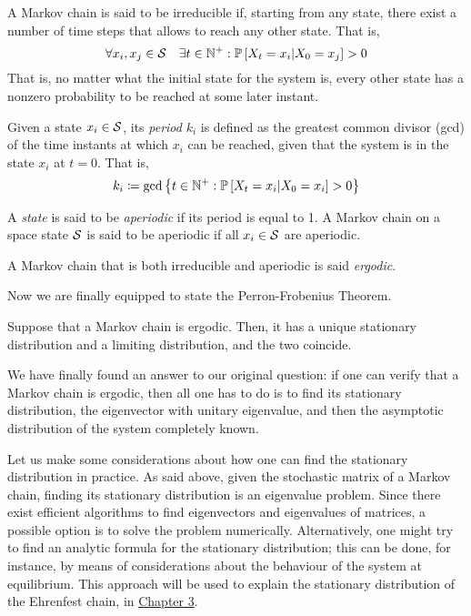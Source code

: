 \begin{ndef} 
    A Markov chain is said to be irreducible if, starting from any state, there exist a number of time steps that allows to reach any other state. That is, 
    \begin{equation}
        \forall x_i, x_j \in \mathcal{S} \quad \exists t\in \mathbb{N}^+ : \mathbb{P}\left[X_t = x_i|X_0 = x_j\right] > 0
    \end{equation}
    That is, no matter what the initial state for the system is, every other state has a nonzero probability to be reached at some later instant.
\end{ndef}
\begin{ndef} 
    Given a state $x_i \in \mathcal{S}$, its \emph{period} $k_i$ is defined as the greatest common divisor (gcd) of the time instants at which $x_i$ can be reached, given that the system is in the state $x_i$ at $t=0$. That is,
    \begin{equation}
        k_i \coloneqq \text{gcd} \left\{ t\in \mathbb{N}^+ : \mathbb{P}\left[X_t = x_i | X_0 = x_i\right] > 0 \right\}
    \end{equation}
    
\end{ndef}
\begin{ndef} [Aperiodicity]
    A \emph{state} is said to be \emph{aperiodic} if its period is equal to 1. A Markov chain on a space state $\mathcal{S}$ is said to be aperiodic if all $x_i \in \mathcal{S}$ are aperiodic. 
\end{ndef}
\begin{ndef} [Ergodicity]
    A Markov chain that is both irreducible and aperiodic is said \emph{ergodic}.
\end{ndef}
Now we are finally equipped to state the Perron-Frobenius Theorem.

\begin{theorem} \label{th:perron-frobenius}
    Suppose that a Markov chain is ergodic. Then, it has a unique stationary distribution and a limiting distribution, and the two coincide.
\end{theorem}

\medskip
We have finally found an answer to our original question: if one can verify that a Markov chain is ergodic, then all one has to do is to find its stationary distribution, \ie the eigenvector with unitary eigenvalue, and then the asymptotic distribution of the system completely known. 

Let us make some considerations about how one can find the stationary distribution in practice. As said above, given the stochastic matrix of a Markov chain, finding its stationary distribution is an eigenvalue problem. Since there exist efficient algorithms to find eigenvectors and eigenvalues of matrices, a possible option is to solve the problem numerically. Alternatively, one might try to find an analytic formula for the stationary distribution; this can be done, for instance, by means of considerations about the behaviour of the system at equilibrium. This approach will be used to explain the stationary distribution of the Ehrenfest chain, in \hyperref[ch:3]{Chapter 3}.


